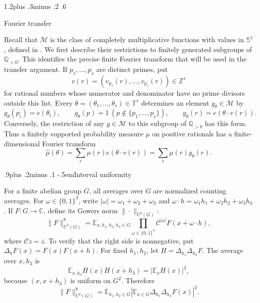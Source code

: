 \documentclass[twoside]{aomart}
\makeatletter
\theoremstyle{paperplain}
\theoremstyle{paperdefinition}
\renewcommand\section{\@startsection{section}{1}{\z@}
  {1.2\baselineskip plus .3\baselineskip minus .2\baselineskip}
  {.6\baselineskip}{\normalfont\large\bfseries\raggedright}}
\renewcommand\subsection{\@startsection{subsection}{2}{\z@}
  {.9\baselineskip plus .2\baselineskip minus .1\baselineskip}
  {-.5em}{\normalfont\bfseries}}
\newcommand{\E}{\mathbb E}
\newcommand{\Z}{\mathbb Z}
\newcommand{\Q}{\mathbb Q}
\newcommand{\C}{\mathbb C}
\newcommand{\T}{\mathbb T}
\numberwithin{equation}{section}
\makeatother
\begin{document}
\section{Fourier transfer}
\label{tr:section}

Recall that $\mathcal M$ is the class of completely multiplicative
functions with values in $\mathbb S^1$, defined in .
We first describe their restrictions to finitely generated subgroups
of $\Q_{>0}$. This identifies the precise finite Fourier transform
that will be used in the transfer argument.
If $p_1,\ldots,p_s$ are distinct primes, put
\begin{equation*}
 v(r)=(v_{p_1}(r),\ldots,v_{p_s}(r))\in\Z^s
\end{equation*}
for rational numbers whose numerator and denominator have no prime
divisors outside this list. Every
$\theta=(\theta_1,\ldots,\theta_s)\in\T^s$ determines an element
$g_\theta\in\mathcal M$ by
\begin{equation*}
 g_\theta(p_i)=e(\theta_i),\qquad
 g_\theta(p)=1\ (p\notin\{p_1,\ldots,p_s\}),\qquad
 g_\theta(r)=e(\theta\cdot v(r)).
\end{equation*}
Conversely, the restriction of any $g\in\mathcal M$ to this
subgroup of $\Q_{>0}$ has this form. Thus a finitely supported
probability measure $\mu$ on positive rationals has a finite-dimensional
Fourier transform
\begin{equation*}
 \widehat\mu(\theta)=\sum_r\mu(r)e(\theta\cdot v(r))
                       =\sum_r\mu(r)g_\theta(r).
\end{equation*}

\subsection{Interval uniformity}

For a finite abelian group $G$, all averages over $G$ are normalized
counting averages. For $\omega\in\{0,1\}^3$, write
$|\omega|=\omega_1+\omega_2+\omega_3$ and
$\omega\cdot h=\omega_1h_1+\omega_2h_2+\omega_3h_3$.
If $F:G\to\C$, define its Gowers norm $\|\cdot\|_{U^3(G)}$:
\begin{equation*}
 \|F\|_{U^3(G)}^8
 =\E_{x,h_1,h_2,h_3\in G}
   \prod_{\omega\in\{0,1\}^3}
      \mathcal C^{|\omega|}F(x+\omega\cdot h),
\end{equation*}
where $\mathcal C z=\overline z$. To verify that the right side is
nonnegative, put $\Delta_hF(x)=F(x)\overline{F(x+h)}$.
For fixed $h_1,h_2$, let $H=\Delta_{h_1}\Delta_{h_2}F$.
The average over $x,h_3$ is
$$\E_{x,h_3}H(x)\overline{H(x+h_3)}=|\E_xH(x)|^2,$$ because
$(x,x+h_3)$ is uniform on $G^2$. Therefore
\begin{equation}
 \|F\|_{U^3(G)}^8
 =\E_{h_1,h_2\in G}
    \left|\E_{x\in G}\Delta_{h_1}\Delta_{h_2}F(x)\right|^2.
 \label{tr:norm-nonnegative}
\end{equation}
\end{document}
